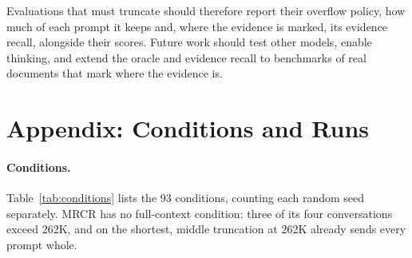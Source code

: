 \documentclass[letterpaper]{article} %
\begin{document}
Evaluations that must truncate should therefore report their overflow policy, how much of each prompt it keeps and, where the evidence is marked, its evidence recall, alongside their scores. Future work should test other models, enable thinking, and extend the oracle and evidence recall to benchmarks of real documents that mark where the evidence is.



\appendix
\section{Appendix: Conditions and Runs}
\paragraph{Conditions.} Table~\ref{tab:conditions} lists the 93 conditions, counting each random seed separately. MRCR has no full-context condition: three of its four conversations exceed 262K, and on the shortest, middle truncation at 262K already sends every prompt whole.
\end{document}
